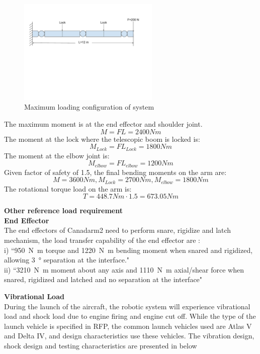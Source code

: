 \begin{figure}[H]
\centering
\includegraphics[width=0.6\textwidth]{Apppic/loading}
\caption{Maximum loading configuration of system}
\label{fig:loading}
\end{figure}

The maximum moment is at the end effector and shoulder joint.
$$M=FL=2400Nm$$
The moment at the lock where the telescopic boom is locked is:
$$M_{Lock} = FL_{Lock} = 1800 Nm$$
The moment at the elbow joint is:
$$M_{elbow} = FL_{elbow} = 1200 Nm$$
Given factor of safety of 1.5, the final bending moments on the arm are:
$$M =3600 Nm, M_{Lock} =2700 Nm, M_{elbow} =1800 Nm$$
The rotational torque load on the arm is:
$$T = 448.7 Nm\cdot1.5=673.05 Nm$$

\large \textbf{Other reference load requirement}\\
\normalsize \textbf{End Effector}\\
The end effectors of Canadarm2 need to perform snare, rigidize and latch mechanism, the load transfer capability of the end effector are \cite{NASAsysreq_Kumar}:\\
i) ``\SI{950}{\newton\metre} torque and \SI{1220}{\newton\metre} bending moment when snared and rigidized, allowing \SI{3}{\degree} separation at the interface."\\
ii) ``\SI{3210}{\newton\metre} moment about any axis and \SI{1110}{\newton\metre} axial/shear force when snared, rigidized and latched and no separation at the interface"

\textbf{Vibrational Load}\\
During the launch of the aircraft, the robotic system will experience vibrational load and shock load due to engine firing and engine cut off. While the type of the launch vehicle is specified in RFP, the common launch vehicles used are Atlas V and Delta IV, and design characteristics use these vehicles. The vibration design, shock design and testing characteristics are presented in  below

